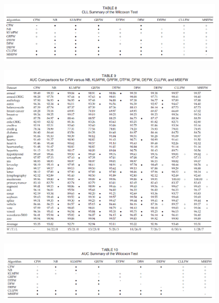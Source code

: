 \documentclass[12pt, a4paper]{article}
\begin{document}
\begin{figure}
    \centering
    \includegraphics[width=\linewidth]{images/article2/table8.png}
    \caption{}
    \label{a2_table8}
\end{figure}

\clearpage

\begin{figure}
    \centering
    \includegraphics[width=\linewidth]{images/article2/table9.png}
    \caption{}
    \label{a2_table9}
\end{figure}

\begin{figure}
    \centering
    \includegraphics[width=\linewidth]{images/article2/table10.png}
    \caption{}
    \label{a2_table10}
\end{figure}

\clearpage
\end{document}
